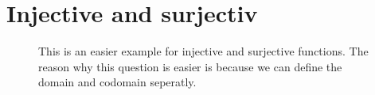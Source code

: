 \documentclass[a5paper]{article}
\begin{document}
\section*{Injective and surjectiv}
\begin{figure}[ht]
	\centering
	\caption*{This is an easier example for injective and surjective functions. The reason why this question is easier is because we can define the domain and codomain seperatly.
	}\label{fig:2017_1-1-1}
\end{figure}
\end{document}
